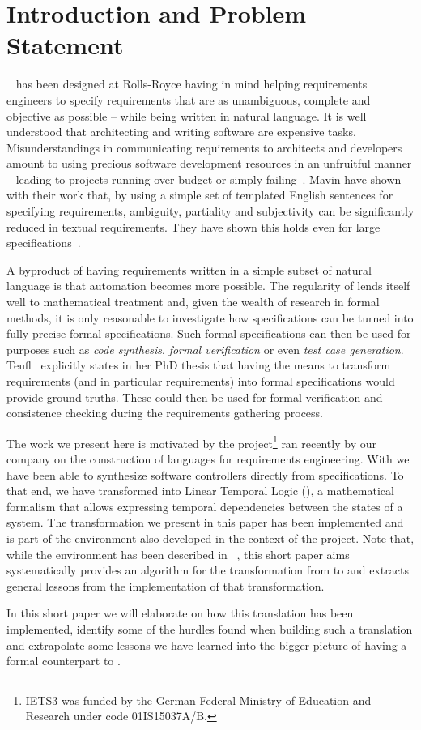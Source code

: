 \section{Introduction and Problem Statement}
\label{sec:introduction}

\ears~\cite{EARS09} has been designed at Rolls-Royce having in mind helping
requirements engineers to specify requirements that are as unambiguous, complete
and objective as possible -- while being written in natural language.
It is well understood that architecting and writing software are
expensive tasks. Misunderstandings in communicating requirements to architects
and developers amount to using precious software development resources in an
unfruitful manner -- leading to projects running over budget or simply
failing~\cite{chaos:2014}. Mavin \etal have shown with their work that, by using
a simple set of templated English sentences for specifying requirements,
ambiguity, partiality and subjectivity can be significantly reduced in textual
requirements. They have shown this holds even for large
specifications~\cite{EARS10,EARS16}.

A byproduct of having requirements written in a simple subset of natural
language is that automation becomes more possible. The regularity of \ears lends
itself well to mathematical treatment and, given the wealth of research in
formal methods, it is only reasonable to investigate how \ears specifications
can be turned into fully precise formal specifications. Such formal
specifications can then be used for purposes such as \emph{code synthesis},
\emph{formal verification} or even \emph{test case generation}.
Teufl~\cite{Teufl17} explicitly states in her PhD thesis that having the means
to transform requirements (and in particular \ears requirements) into formal
specifications would provide ground truths. These could then be used for formal
verification and consistence checking during the requirements gathering
process.

The work we present here is motivated by the \iets project\footnote{IETS3 was
funded by the German Federal Ministry of Education and Research under code
01IS15037A/B.} ran recently by our company on the construction of languages for
requirements engineering. With \iets we have been able to synthesize software
controllers directly from \ears specifications. To that end, we have transformed
\ears into Linear Temporal Logic (\ltl), a mathematical formalism that allows expressing
temporal dependencies between the states of a system. The transformation we
present in this paper has been implemented and is part of the \earsctrl
environment also developed in the context of the \iets project. Note that, while
the \earsctrl environment has been
described in ~\cite{earsctrlProcess,LucioRCA16,LucioRAM17}, this short paper
aims systematically provides an algorithm for the transformation from \ears
to \ltl and extracts general lessons from the implementation of that
transformation.

In this short paper we will elaborate on how this translation has been
implemented, identify some of the hurdles found when building such a translation and
extrapolate some lessons we have learned into the bigger picture of having a
formal counterpart to \ears.